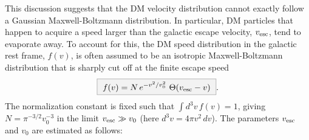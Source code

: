 This discussion suggests that the DM velocity distribution cannot exactly follow a Gaussian Maxwell-Boltzmann  distribution.
In particular, DM particles that happen to acquire a speed larger than the galactic escape velocity, $v_{\rm esc}$, tend to evaporate away.
To account for this, the DM  speed distribution in the galactic rest frame, $f(v)$, is often assumed to be an isotropic 
Maxwell-Boltzmann distribution that is sharply cut off at the finite escape speed
\begin{equation}
\label{eq:MB}
\bbox{f( v) = N\,  e^{-v^2/v_0^2} \ \Theta(v_{\rm esc}-v)}.
\end{equation}
The normalization constant is fixed such that $\int d^3v\, f(v) = 1$,
giving $N=\pi^{-3/2} v_0^{-3}$ in the limit $v_{\rm esc}\gg v_0$ (here $d^3v =4\pi v^2\, dv$). The parameters $v_{\rm esc}$ and $v_0$ are estimated as follows:
